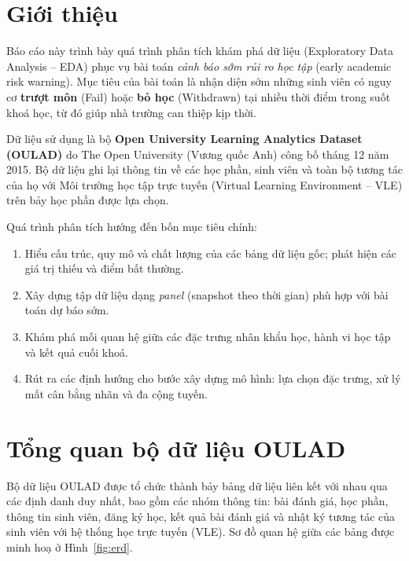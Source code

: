 \documentclass[a4paper]{article}
\begin{document}

\section{Giới thiệu}

Báo cáo này trình bày quá trình phân tích khám phá dữ liệu (Exploratory Data
Analysis -- EDA) phục vụ bài toán \textit{cảnh báo sớm rủi ro học tập} (early
academic risk warning). Mục tiêu của bài toán là nhận diện sớm những sinh viên
có nguy cơ \textbf{trượt môn} (Fail) hoặc \textbf{bỏ học} (Withdrawn) tại nhiều
thời điểm trong suốt khoá học, từ đó giúp nhà trường can thiệp kịp thời.

Dữ liệu sử dụng là bộ \textbf{Open University Learning Analytics Dataset
(OULAD)} do The Open University (Vương quốc Anh) công bố tháng 12 năm 2015. Bộ
dữ liệu ghi lại thông tin về các học phần, sinh viên và toàn bộ tương tác của
họ với Môi trường học tập trực tuyến (Virtual Learning Environment -- VLE) trên
bảy học phần được lựa chọn.

Quá trình phân tích hướng đến bốn mục tiêu chính:

\begin{enumerate}[leftmargin=*]
  \item Hiểu cấu trúc, quy mô và chất lượng của các bảng dữ liệu gốc; phát hiện
        các giá trị thiếu và điểm bất thường.
  \item Xây dựng tập dữ liệu dạng \textit{panel} (snapshot theo thời gian) phù
        hợp với bài toán dự báo sớm.
  \item Khám phá mối quan hệ giữa các đặc trưng nhân khẩu học, hành vi học tập
        và kết quả cuối khoá.
  \item Rút ra các định hướng cho bước xây dựng mô hình: lựa chọn đặc trưng,
        xử lý mất cân bằng nhãn và đa cộng tuyến.
\end{enumerate}

\section{Tổng quan bộ dữ liệu OULAD}

Bộ dữ liệu OULAD được tổ chức thành bảy bảng dữ liệu liên kết với nhau qua các
định danh duy nhất, bao gồm các nhóm thông tin: bài đánh giá, học phần, thông tin
sinh viên, đăng ký học, kết quả bài đánh giá và nhật ký tương tác của sinh viên
với hệ thống học trực tuyến (VLE). Sơ đồ quan hệ giữa các bảng được minh hoạ ở
Hình~\ref{fig:erd}.
\end{document}
